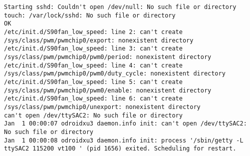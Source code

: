 \begin{lstlisting}
Starting sshd: Couldn't open /dev/null: No such file or directory
touch: /var/lock/sshd: No such file or directory
OK
/etc/init.d/S90fan_low_speed: line 2: can't create /sys/class/pwm/pwmchip0/export: nonexistent directory
/etc/init.d/S90fan_low_speed: line 3: can't create /sys/class/pwm/pwmchip0/pwm0/period: nonexistent directory
/etc/init.d/S90fan_low_speed: line 4: can't create /sys/class/pwm/pwmchip0/pwm0/duty_cycle: nonexistent directory
/etc/init.d/S90fan_low_speed: line 5: can't create /sys/class/pwm/pwmchip0/pwm0/enable: nonexistent directory
/etc/init.d/S90fan_low_speed: line 6: can't create /sys/class/pwm/pwmchip0/unexport: nonexistent directory
can't open /dev/ttySAC2: No such file or directory
Jan  1 00:00:07 odroidxu3 daemon.info init: can't open /dev/ttySAC2: No such file or directory
Jan  1 00:00:08 odroidxu3 daemon.info init: process '/sbin/getty -L  ttySAC2 115200 vt100 ' (pid 1656) exited. Scheduling for restart.
\end{lstlisting}
